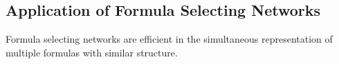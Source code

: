 \subsection{Application of Formula Selecting Networks}

Formula selecting networks are efficient in the simultaneous representation of multiple formulas with similar structure.



%
%
%



